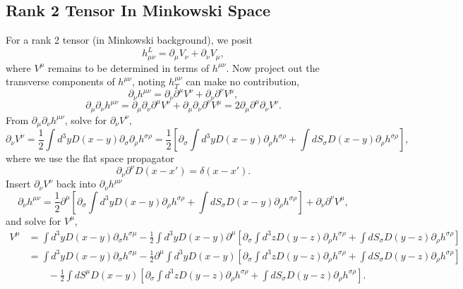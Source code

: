 \documentclass[10pt,letterpaper]{article}
\begin{document}
\subsection*{Rank 2 Tensor In Minkowski Space}
For a rank 2 tensor (in Minkowski background), we posit
\begin{equation}
h^L_{\mu\nu} = \partial_\mu V_\nu + \partial_\nu V_\mu,
\end{equation}
where $V^{\mu}$ remains to be determined in terms of $h^{\mu\nu}$.
Now project out the transverse components of $h^{\mu\nu}$, noting $h^{\mu\nu}_T$ can make no contribution,
\begin{equation}
\partial_\nu h^{\mu\nu} = \partial_\nu \partial^\mu V^\nu + \partial_\nu \partial^\nu V^\mu,
\end{equation}
\begin{equation}
\partial_\mu \partial_\nu h^{\mu\nu} = \partial_\mu\partial_\nu \partial^\mu V^\nu + \partial_\mu\partial_\nu \partial^\nu V^\mu
= 2 \partial_\mu \partial^\mu \partial_\nu V^\nu.
\end{equation}
From $\partial_\mu\partial_\nu h^{\mu\nu}$, solve for $\partial_\nu V^\nu$,
\begin{equation}
\partial_\nu V^\nu = \frac12 \int d^3y D(x-y) \partial_\sigma\partial_\rho h^{\sigma\rho}
= \frac12\left[ \partial_\sigma \int d^3y D(x-y)\partial_\rho h^{\sigma\rho}
+ \int dS_\sigma D(x-y) \partial_\rho h^{\sigma\rho}\right],
\end{equation}
where we use the flat space propagator
\begin{equation}
\partial_\nu \partial^\nu D(x-x') = \delta(x-x').
\end{equation}
Insert $\partial_\nu V^\nu$ back into $\partial_\nu h^{\mu\nu}$
\begin{equation}
\partial_\nu h^{\mu\nu} =  \frac12 \partial^\mu\left[ \partial_\sigma \int d^3y D(x-y)\partial_\rho h^{\sigma\rho}
+ \int dS_\sigma D(x-y) \partial_\rho h^{\sigma\rho}\right] + \partial_\nu \partial^\nu V^\mu,
\end{equation}
and solve for $V^\mu$,
\begin{align}
V^\mu &= \int d^3y D(x-y)\partial_\sigma h^{\sigma\mu} -  \frac12\int d^3y D(x-y) \partial^\mu \left[ \partial_\sigma \int d^3z D(y-z)\partial_\rho h^{\sigma\rho}
+ \int dS_\sigma D(y-z) \partial_\rho h^{\sigma\rho}\right]\\
&=  \int d^3y D(x-y)\partial_\sigma h^{\sigma\mu} -  \frac12
\partial^\mu \int d^3y D(x-y)\left[ \partial_\sigma \int d^3z D(y-z)\partial_\rho h^{\sigma\rho}
+ \int dS_\sigma D(y-z) \partial_\rho h^{\sigma\rho}\right]\\
&\qquad
-\frac12 \int dS^\mu D(x-y)\left[ \partial_\sigma \int d^3z D(y-z)\partial_\rho h^{\sigma\rho}
+ \int dS_\sigma D(y-z) \partial_\rho h^{\sigma\rho}\right].
\end{align}
\end{document}

